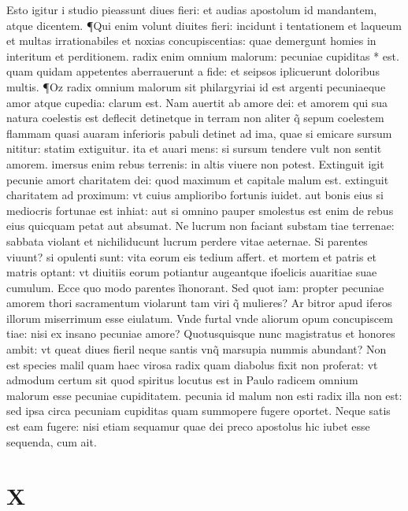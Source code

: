 \documentclass{article}
\begin{document}
\begin{pages}
Esto igitur i studio pieassunt diues fieri: et audias apostolum id mandantem, atque dicentem. ¶Qui enim volunt diuites fieri: incidunt i tentationem et laqueum et multas irrationabiles et noxias concupiscentias: quae demergunt homies in interitum et perditionem. radix enim omnium malorum: pecuniae cupiditas * est. quam quidam appetentes aberrauerunt a fide: et seipsos iplicuerunt doloribus multis. ¶Oz radix omnium malorum sit philargyriai id est argenti pecuniaeque amor atque cupedia: clarum est. Nam auertit ab amore dei: et amorem qui sua natura coelestis est deflecit detinetque in terram non aliter q̃ sepum coelestem flammam quasi auaram inferioris pabuli detinet ad ima, quae si emicare sursum nititur: statim extiguitur. ita et auari mens: si sursum tendere vult non sentit amorem. imersus enim rebus terrenis: in altis viuere non potest. Extinguit igit pecunie amort charitatem dei: quod maximum et capitale malum est. extinguit charitatem ad proximum: vt cuius amplioribo fortunis iuidet. aut bonis eius si mediocris fortunae est inhiat: aut si omnino pauper smolestus est enim de rebus eius quicquam petat aut absumat. Ne lucrum non faciant substam tiae terrenae: sabbata violant et nichiliducunt lucrum perdere vitae aeternae. Si parentes viuunt? si opulenti sunt: vita eorum eis tedium affert. et mortem et patris et matris optant: vt diuitiis eorum potiantur augeantque ifoelicis auaritiae suae cumulum. Ecce quo modo parentes ĩhonorant. Sed quot iam: propter pecuniae amorem thori sacramentum violarunt tam viri q̃ mulieres? Ar bitror apud iferos illorum miserrimum esse eiulatum. Vnde furtal vnde aliorum opum concupiscem tiae: nisi ex insano pecuniae amore? Quotusquisque nunc magistratus et honores ambit: vt queat diues fieril neque santis vnq̃ marsupia nummis abundant? Non est species malil quam haec virosa radix quam diabolus fixit non proferat: vt admodum certum sit quod spiritus locutus est in Paulo radicem omnium malorum esse pecuniae cupiditatem. pecunia id malum non esti radix illa non est: sed ipsa circa pecuniam cupiditas quam summopere fugere oportet. Neque satis est eam fugere: nisi etiam sequamur quae dei preco apostolus hic iubet esse sequenda, cum ait.  \pend
\section*{X }

\end{pages}
\end{document}
